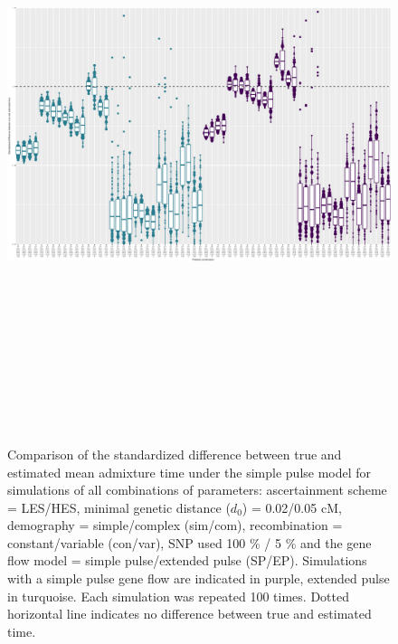 \documentclass[11pt]{article}
\begin{document}
\begin{figure}
\centering
\includegraphics[width=16cm,height=18cm,keepaspectratio]{ATE_Revisions_files/figure-latex/figS2_updated_SP-1.pdf}
\caption{\label{fig:figSGLM_data_SP} Comparison of the standardized difference between true and estimated mean admixture time under the simple pulse model for simulations of all combinations of parameters: ascertainment scheme = LES/HES,   minimal genetic distance ($d_{0}$) = 0.02/0.05 cM, demography = simple/complex (sim/com), recombination = constant/variable (con/var), SNP used 100 \% / 5 \% and the gene flow model = simple pulse/extended pulse (SP/EP). Simulations with a simple pulse gene flow are indicated in purple, extended pulse in turquoise. Each simulation was repeated 100 times. Dotted horizontal line indicates no difference between true and estimated time.}
\end{figure}
\end{document}
